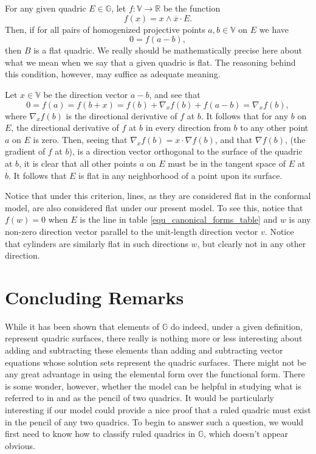 \documentclass{birkjour}
\theoremstyle{definition}
\theoremstyle{remark}
\numberwithin{equation}{section}
\newcommand{\G}{\mathbb{G}}
\newcommand{\V}{\mathbb{V}}
\newcommand{\R}{\mathbb{R}}
\begin{document}
For any given quadric $E\in\G$, let $f:\V\to\R$ be the function
\begin{equation}
f(x) = x\wedge\overline{x}\cdot E.
\end{equation}
Then, if for all pairs of homogenized projective points $a,b\in\V$
on $E$ we have
\begin{equation}
0=f(a-b),
\end{equation}
then $B$ is a flat quadric.  We really
should be mathematically precise here about what we mean when
we say that a given quadric is flat.  The reasoning behind this
condition, however, may suffice as adequate meaning.

Let $x\in\V$ be the direction vector $a-b$, and see that
\begin{equation}
0=f(a) = f(b+x) = f(b) + \nabla_x f(b) + f(a-b) = \nabla_x f(b),
\end{equation}
where $\nabla_x f(b)$ is the directional derivative of $f$ at $b$.
It follows that for any $b$ on $E$, the directional derivative of $f$ at $b$ in every
direction from $b$ to any other point $a$ on $E$ is zero.  Then, seeing that
$\nabla_x f(b)=x\cdot\nabla f(b)$, and that $\nabla f(b)$, (the gradient of
$f$ at $b$), is a direction vector orthogonal to the surface of the quadric at $b$,
it is clear that all other points $a$ on $E$ must be in the tangent space
of $E$ at $b$.  It follows that $E$ is flat in any neighborhood of a point
upon its surface.

Notice that under this criterion, lines, as they are considered flat in the conformal
model, are also considered flat under our present model.  To see this, notice that $f(w)=0$ when
$E$ is the line in table \eqref{equ_canonical_forms_table} and $w$ is any non-zero direction
vector parallel to the unit-length direction vector $v$.  Notice that cylinders are similarly
flat in such directions $w$, but clearly not in any other direction.

\section{Concluding Remarks}

While it has been shown that elements of $\G$ do indeed, under a given
definition, represent quadric surfaces, there really is nothing more or less
interesting about adding and subtracting these elements than adding and
subtracting vector equations whose solution sets represent the quadric surfaces.
There might not be any great advantage in using the elemental form over the
functional form.  There is some wonder, however, whether the model can
be helpful in studying what is referred to in \cite{Miller87}
and \cite{ZhiqiangXu05} as the pencil of two quadrics.
It would be particularly interesting if our model could provide a nice proof
that a ruled quadric must exist in the pencil of any two quadrics.
To begin to answer such a question, we would first need to know
how to classify ruled quadrics in $\G$, which doesn't appear obvious.
\end{document}
